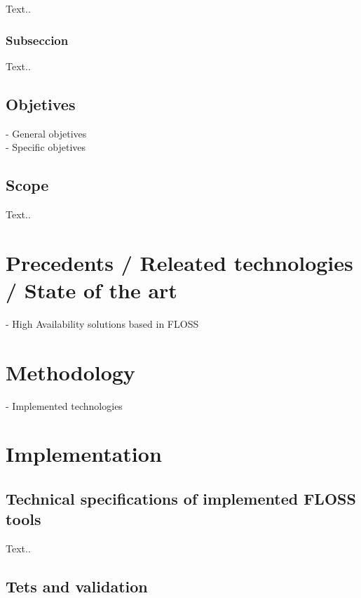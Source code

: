 \documentclass[a4paper, 12pt]{book}
\begin{document}
Text..

	\subsection{Subseccion}
	\label{subsec:subsection}

Text..

\section{Objetives}
\label{sec:objetives}

- General objetives\\
- Specific objetives

\section{Scope}
\label{sec:scope}

Text..


%
\chapter{Precedents / Releated technologies / State of the art}
\label{chap:precedents}

- High Availability solutions based in FLOSS


%
\chapter{Methodology}
\label{chap:methodology}

- Implemented technologies

%
\chapter{Implementation}
\label{chap:implementation}

\section{Technical specifications of implemented FLOSS tools}
\label{sec:specifications}

Text..

\section{Tets and validation}
\label{sec:tests}
\end{document}
